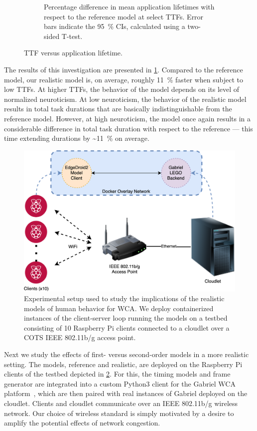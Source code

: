 \begin{figure}
\begin{subfigure}[t]{.45\textwidth}
        \caption{%
            Percentage difference in mean application lifetimes with respect to the reference model at select \glspl{TTF}.
            Error bars indicate the \SI{95}{\percent} \glspl{CI}, calculated using a two-sided T-test.
        }
    \end{subfigure}
    \caption{\gls{TTF} versus application lifetime.}\label{fig:lifetimes}
\end{figure}

The results of this investigation are presented in \cref{fig:lifetimes}.
Compared to the reference model, our realistic model is, on average, roughly \SI{11}{\percent} faster when subject to low \glspl{TTF}.
At higher \glspl{TTF}, the behavior of the model depends on its level of normalized neuroticism.
At low neuroticism, the behavior of the realistic model results in total task durations that are basically indistinguishable from the reference model.
However, at high neuroticism, the model once again results in a considerable difference in total task duration with respect to the reference --- this time extending durations by \textasciitilde\SI{11}{\percent} on average.

\begin{figure}
    \centering
    \includegraphics[width=.9\textwidth]{figs/EdgeDroid2ExperimentalSetup}
    \caption{%
        Experimental setup used to study the implications of the realistic models of human behavior for \gls{WCA}.
        We deploy containerized instances of the client-server loop running the models on a testbed consisting of \num{10} Raspberry Pi clients connected to a cloudlet over a \gls{COTS} \gls{IEEE} \num{802.11}b/g access point.
    }\label{fig:expsetup}
\end{figure}

Next we study the effects of first- versus second-order models in a more realistic setting.
The models, reference and realistic, are deployed on the Raspberry Pi clients of the testbed depicted in \cref{fig:expsetup}.
For this, the timing models and frame generator are integrated into a custom Python3 client for the Gabriel \gls{WCA} platform~\cite{chen2018application}, which are then paired with real instances of Gabriel deployed on the cloudlet.
Clients and cloudlet communicate over an \gls{IEEE} \num{802.11}b/g wireless network.
Our choice of wireless standard is simply motivated by a desire to amplify the potential effects of network congestion.

